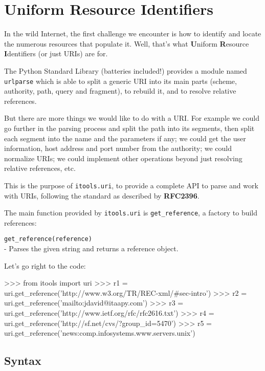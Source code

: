 
\chapter{Uniform Resource Identifiers}

In the wild Internet, the first challenge we encounter is how to identify
and locate the numerous resources that populate it. Well, that's what
{\bf U}niform {\bf R}esource {\bf I}dentifiers (or just URIs) are for.

The Python Standard Library (batteries included!) provides a module named
{\tt urlparse} which is able to split a generic URI into its main parts
(scheme, authority, path, query and fragment), to rebuild it, and to
resolve relative references.

But there are more things we would like to do with a URI. For example we
could go further in the parsing process and split the path into its segments,
then split each segment into the name and the parameters if any; we could
get the user information, host address and port number from the authority;
we could normalize URIs; we could implement other operations beyond just
resolving relative references, etc.

This is the purpose of {\tt itools.uri}, to provide a complete API to parse
and work with URIs, following the standard as described by {\bf RFC2396}.

The main function provided by {\tt itools.uri} is {\tt get\_reference},
a factory to build references:

\begin{api}
    {\tt get\_reference(reference)}\\
    - Parses the given string and returns a reference object.
\end{api}

Let's go right to the code:

\begin{code}
    >>> from itools import uri
    >>> r1 = uri.get_reference('http://www.w3.org/TR/REC-xml/#sec-intro')
    >>> r2 = uri.get_reference('mailto:jdavid@itaapy.com')
    >>> r3 = uri.get_reference('http://www.ietf.org/rfc/rfc2616.txt')
    >>> r4 = uri.get_reference('http://sf.net/cvs/?group_id=5470')
    >>> r5 = uri.get_reference('news:comp.infosystems.www.servers.unix')
\end{code}


\section{Syntax}

